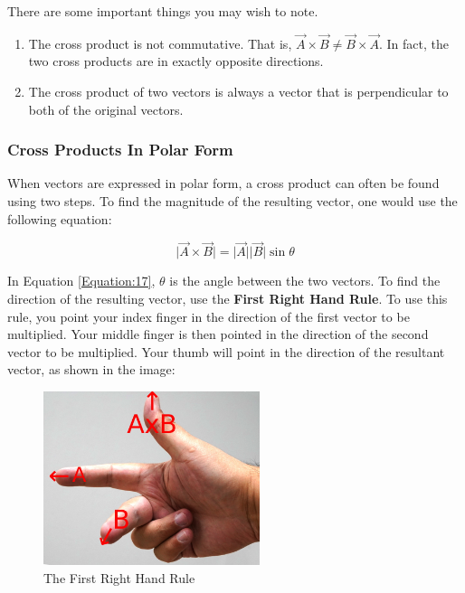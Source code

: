 	There are some important things you may wish to note.  
	\begin{enumerate}
		\item The cross product is not commutative.  That is, $\vec{A} \times \vec{B} \neq \vec{B} \times \vec{A}$.  In fact, the two cross products are in exactly opposite directions.  
		\item The cross product of two vectors is always a vector that is perpendicular to both of the original vectors.  
	\end{enumerate}


\subsubsection{Cross Products In Polar Form}
	When vectors are expressed in polar form, a cross product can often be found using two steps.  To find the magnitude of the resulting vector, one would use the following equation:
	
\begin{mdframed}[backgroundcolor=orange!20!white]
	\begin{equation}
	\lvert \vec{A} \times \vec{B} \rvert = 	\lvert \vec{A} \rvert \lvert\vec{B} \rvert \sin \theta
	\label{Equation:17}
	\end{equation}
\end{mdframed}	

\label{RHR1}
In Equation \ref{Equation:17}, $\theta$ is the angle between the two vectors.  To find the direction of the resulting vector, use the \textbf{First Right Hand Rule}.    To use this rule, you point your index finger in the direction of the first vector to be multiplied.  Your middle finger is then pointed in the direction of the second vector to be multiplied.  Your thumb will point in the direction of the resultant vector, as shown in the image: 

\begin{center}
	\begin{figure}[h]
		\centering
	\includegraphics[height=2in]{./Chapters/Ch01-intro/righthandrule.JPG}	
	\caption{The First Right Hand Rule}
	\end{figure}
	
\end{center}

